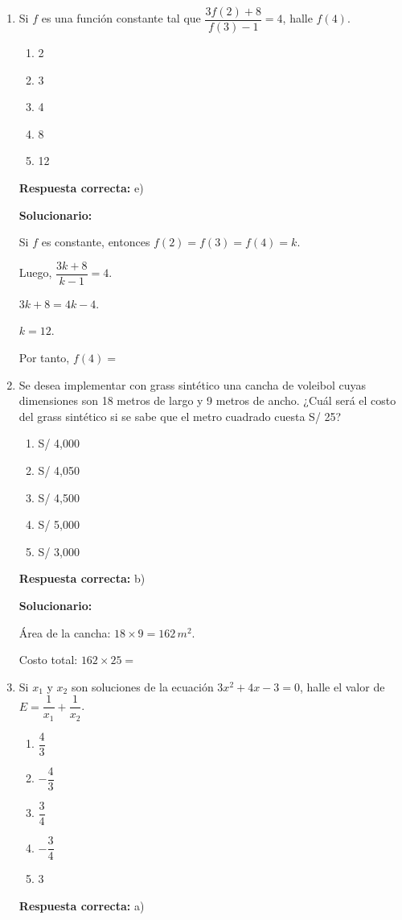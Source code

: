 \begin{enumerate}[resume]

	
	\item Si $f$ es una función constante tal que $\dfrac{3f(2)+8}{f(3)-1}=4$, halle $f(4)$.
	\begin{enumerate}[label=\alph*)]
		\item 2
		\item 3
		\item 4
		\item 8
		\item 12
	\end{enumerate}
	\textbf{Respuesta correcta:} e)
	
	\vspace{2mm}
	\textbf{Solucionario:}
	
	Si $f$ es constante, entonces $f(2)=f(3)=f(4)=k$.
	
	Luego, $\dfrac{3k+8}{k-1}=4$.
	
	$3k+8=4k-4$.
	
	$k=12$.
	
	Por tanto, $f(4)=$
	
	\vspace{6mm}
	
	\item Se desea implementar con grass sintético una cancha de voleibol cuyas dimensiones son 18 metros de largo y 9 metros de ancho. ¿Cuál será el costo del grass sintético si se sabe que el metro cuadrado cuesta S/ 25?
	\begin{enumerate}[label=\alph*)]
		\item S/ 4,000
		\item S/ 4,050
		\item S/ 4,500
		\item S/ 5,000
		\item S/ 3,000
	\end{enumerate}
	\textbf{Respuesta correcta:} b)
	
	\vspace{2mm}
	\textbf{Solucionario:}
	
	Área de la cancha: $18\times 9=162\,m^2$.
	
	Costo total: $162\times 25=$
	
	\vspace{6mm}
	
	\item Si $x_1$ y $x_2$ son soluciones de la ecuación $3x^2+4x-3=0$, halle el valor de $E=\dfrac{1}{x_1}+\dfrac{1}{x_2}$.
	\begin{enumerate}[label=\alph*)]
		\item $\dfrac{4}{3}$
		\item $-\dfrac{4}{3}$
		\item $\dfrac{3}{4}$
		\item $-\dfrac{3}{4}$
		\item 3
	\end{enumerate}
	\textbf{Respuesta correcta:} a)
	

\end{enumerate}
